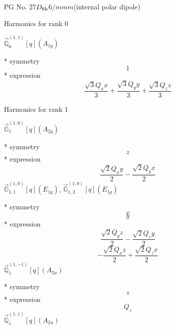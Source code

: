 \documentclass[fleqn,8pt]{jsarticle}
\begin{document}
\setcounter{MaxMatrixCols}{32}

\renewcommand{\tablename}{Table~}
\renewcommand{\figurename}{Figure~}
\begin{center}
\LARGE
PG No. 27\quad$D_{\rm 6h}$\quad$6/mmm$\quad[ hexagonal ] (internal polar dipole)
\end{center}

\noindent * Harmonics for rank 0

\noindent\quad $\vec{\mathbb{Q}}_{0}^{(1,1)}[q](A_{1g})$

\noindent\quad ** symmetry
\begin{dmath*}
1
\end{dmath*}
\noindent\quad ** expression
\begin{dmath*}
\frac{\sqrt{3} Q_{x} x}{3} + \frac{\sqrt{3} Q_{y} y}{3} + \frac{\sqrt{3} Q_{z} z}{3}
\end{dmath*}

\noindent * Harmonics for rank 1

\noindent\quad $\vec{\mathbb{G}}_{1}^{(1,0)}[q](A_{2g})$

\noindent\quad ** symmetry
\begin{dmath*}
z
\end{dmath*}
\noindent\quad ** expression
\begin{dmath*}
\frac{\sqrt{2} Q_{x} y}{2} - \frac{\sqrt{2} Q_{y} x}{2}
\end{dmath*}
\noindent\quad $\vec{\mathbb{G}}_{1,1}^{(1,0)}[q](E_{1g})$, $\vec{\mathbb{G}}_{1,2}^{(1,0)}[q](E_{1g})$

\noindent\quad ** symmetry
\begin{dmath*}
x
\end{dmath*}
\begin{dmath*}
y
\end{dmath*}
\noindent\quad ** expression
\begin{dmath*}
\frac{\sqrt{2} Q_{y} z}{2} - \frac{\sqrt{2} Q_{z} y}{2}
\end{dmath*}
\begin{dmath*}
- \frac{\sqrt{2} Q_{x} z}{2} + \frac{\sqrt{2} Q_{z} x}{2}
\end{dmath*}
\noindent\quad $\vec{\mathbb{Q}}_{1}^{(1,-1)}[q](A_{2u})$

\noindent\quad ** symmetry
\begin{dmath*}
z
\end{dmath*}
\noindent\quad ** expression
\begin{dmath*}
Q_{z}
\end{dmath*}
\noindent\quad $\vec{\mathbb{Q}}_{1}^{(1,1)}[q](A_{2u})$
\end{document}
